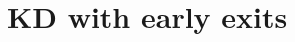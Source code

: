 \documentclass[aspectratio=169,xcolor=dvipsnames]{beamer}
\begin{document}



\section{KD with early exits}
\end{document}
